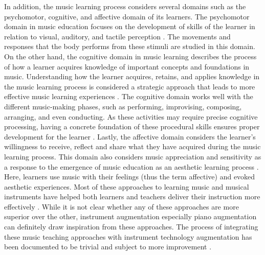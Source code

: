 \documentclass[sigconf, screen, review]{acmart}
\begin{document}
In addition, the music learning process considers several domains such as the psychomotor, cognitive, and affective domain of its learners. The psychomotor domain in music education focuses on the development of skills of the learner in relation to visual, auditory, and tactile perception \cite{simpson1966classification}. The movements and responses that the body performs from these stimuli are studied in this domain. On the other hand, the cognitive domain in music learning describes the process of how a learner acquires knowledge of important concepts and foundations in music. Understanding how the learner acquires, retains, and applies knowledge in the music learning process is considered a strategic approach that leads to more effective music learning experiences \cite{hanna2007new}. The cognitive domain works well with the different music-making phases, such as performing, improvising, composing, arranging, and even conducting. As these activities may require precise cognitive processing, having a concrete foundation of these procedural skills ensures proper development for the learner \cite{westerlund2003reconsidering}. Lastly, the affective domain considers the learner's willingness to receive, reflect and share what they have acquired during the music learning process. This domain also considers music appreciation and sensitivity as a response to the emergence of music education as an aesthetic learning process \cite{mccarthy2002music}. Here, learners use music with their feelings (thus the term affective) and evoked aesthetic experiences. Most of these approaches to learning music and musical instruments have helped both learners and teachers deliver their instruction more effectively \cite{burns2020using}. While it is not clear whether any of these approaches are more superior over the other, instrument augmentation especially piano augmentation can definitely draw inspiration from these approaches. The process of integrating these music teaching approaches with instrument technology augmentation has been documented to be trivial and subject to more improvement \cite{beckstead2001will}.  %
\end{document}
